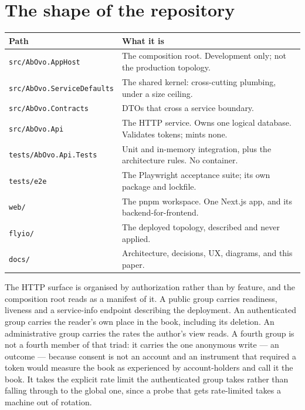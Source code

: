 \documentclass[11pt,a4paper]{article}
\begin{document}
\section{The shape of the repository}

\begin{table}[ht]
\centering
\small
\begin{tabular}{@{}ll@{}}
\toprule
\textbf{Path} & \textbf{What it is} \\
\midrule
\texttt{src/AbOvo.AppHost}        & The composition root. Development only; not the production topology. \\
\texttt{src/AbOvo.ServiceDefaults} & The shared kernel: cross-cutting plumbing, under a size ceiling. \\
\texttt{src/AbOvo.Contracts}      & DTOs that cross a service boundary. \\
\texttt{src/AbOvo.Api}            & The HTTP service. Owns one logical database. Validates tokens; mints none. \\
\texttt{tests/AbOvo.Api.Tests}    & Unit and in-memory integration, plus the architecture rules. No container. \\
\texttt{tests/e2e}                & The Playwright acceptance suite; its own package and lockfile. \\
\texttt{web/}                     & The pnpm workspace. One Next.js app, and its backend-for-frontend. \\
\texttt{flyio/}                   & The deployed topology, described and never applied. \\
\texttt{docs/}                    & Architecture, decisions, UX, diagrams, and this paper. \\
\bottomrule
\end{tabular}
\end{table}

The HTTP surface is organised by authorization rather than by feature, and the composition
root reads as a manifest of it. A public group carries readiness, liveness and a service-info
endpoint describing the deployment. An authenticated group carries the reader's own place in
the book, including its deletion. An administrative group carries the rates the author's view
reads. A fourth group is not a fourth member of that triad: it carries the one anonymous
write --- an outcome --- because consent is not an account and an instrument that required a
token would measure the book as experienced by account-holders and call it the book. It takes
the explicit rate limit the authenticated group takes rather than falling through to the
global one, since a probe that gets rate-limited takes a machine out of rotation.
\end{document}
